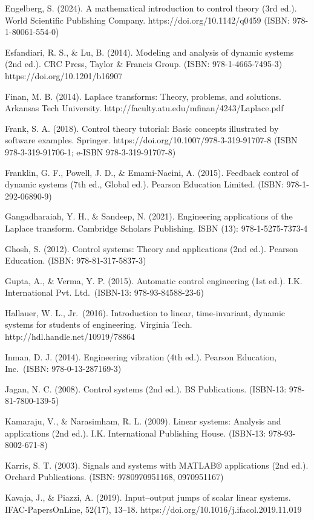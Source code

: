 \documentclass[
  11pt,
]{article}
\begin{document}
Engelberg, S. (2024). A mathematical introduction to control theory (3rd
ed.). World Scientific Publishing Company. https://doi.org/10.1142/q0459
(ISBN: 978-1-80061-554-0)

Esfandiari, R. S., \& Lu, B. (2014). Modeling and analysis of dynamic
systems (2nd ed.). CRC Press, Taylor \& Francis Group. (ISBN:
978-1-4665-7495-3) https://doi.org/10.1201/b16907

Finan, M. B. (2014). Laplace transforms: Theory, problems, and
solutions. Arkansas Tech University.
http://faculty.atu.edu/mfinan/4243/Laplace.pdf

Frank, S. A. (2018). Control theory tutorial: Basic concepts illustrated
by software examples. Springer.
https://doi.org/10.1007/978-3-319-91707-8 (ISBN 978-3-319-91706-1;
e-ISBN 978-3-319-91707-8)

Franklin, G. F., Powell, J. D., \& Emami-Naeini, A. (2015). Feedback
control of dynamic systems (7th ed., Global ed.). Pearson Education
Limited. (ISBN: 978-1-292-06890-9)

Gangadharaiah, Y. H., \& Sandeep, N. (2021). Engineering applications of
the Laplace transform. Cambridge Scholars Publishing. ISBN (13):
978-1-5275-7373-4

Ghosh, S. (2012). Control systems: Theory and applications (2nd ed.).
Pearson Education. (ISBN: 978-81-317-5837-3)

Gupta, A., \& Verma, Y. P. (2015). Automatic control engineering (1st
ed.). I.K. International Pvt. Ltd.~(ISBN-13: 978-93-84588-23-6)

Hallauer, W. L., Jr.~(2016). Introduction to linear, time-invariant,
dynamic systems for students of engineering. Virginia Tech.
http://hdl.handle.net/10919/78864

Inman, D. J. (2014). Engineering vibration (4th ed.). Pearson Education,
Inc.~(ISBN: 978-0-13-287169-3)

Jagan, N. C. (2008). Control systems (2nd ed.). BS Publications.
(ISBN-13: 978-81-7800-139-5)

Kamaraju, V., \& Narasimham, R. L. (2009). Linear systems: Analysis and
applications (2nd ed.). I.K. International Publishing House. (ISBN-13:
978-93-8002-671-8)

Karris, S. T. (2003). Signals and systems with MATLAB® applications (2nd
ed.). Orchard Publications. (ISBN: 9780970951168, 0970951167)

Kavaja, J., \& Piazzi, A. (2019). Input--output jumps of scalar linear
systems. IFAC-PapersOnLine, 52(17), 13--18.
https://doi.org/10.1016/j.ifacol.2019.11.019
\end{document}
